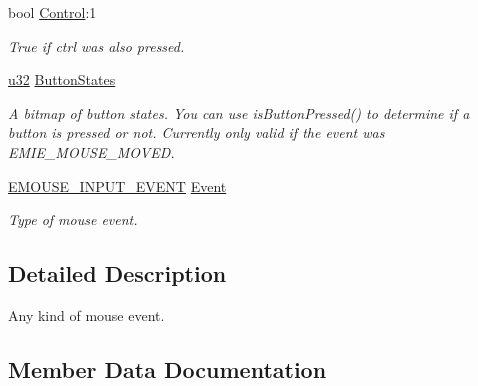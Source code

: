 \begin{DoxyCompactItemize}
bool \hyperlink{structirr_1_1SEvent_1_1SMouseInput_a2b0cf7a5d52c4489dbfc739fe62aa354}{Control}\+:1
\begin{DoxyCompactList}\small\item\em True if ctrl was also pressed. \end{DoxyCompactList}\item 
\mbox{\label{structirr_1_1SEvent_1_1SMouseInput_af2f4e21a673879db7f89335ccdc3efdd}} 
\hyperlink{namespaceirr_a0416a53257075833e7002efd0a18e804}{u32} \hyperlink{structirr_1_1SEvent_1_1SMouseInput_af2f4e21a673879db7f89335ccdc3efdd}{Button\+States}
\begin{DoxyCompactList}\small\item\em A bitmap of button states. You can use is\+Button\+Pressed() to determine if a button is pressed or not. Currently only valid if the event was E\+M\+I\+E\+\_\+\+M\+O\+U\+S\+E\+\_\+\+M\+O\+V\+ED. \end{DoxyCompactList}\item 
\mbox{\label{structirr_1_1SEvent_1_1SMouseInput_adc389bcfee10b86dc5c6d2f39c4f5acd}} 
\hyperlink{namespaceirr_a2dbf2a247aa17a9eeefbbf36ebd5739f}{E\+M\+O\+U\+S\+E\+\_\+\+I\+N\+P\+U\+T\+\_\+\+E\+V\+E\+NT} \hyperlink{structirr_1_1SEvent_1_1SMouseInput_adc389bcfee10b86dc5c6d2f39c4f5acd}{Event}
\begin{DoxyCompactList}\small\item\em Type of mouse event. \end{DoxyCompactList}\end{DoxyCompactItemize}


\subsection{Detailed Description}
Any kind of mouse event. 

\subsection{Member Data Documentation}
\mbox{\label{structirr_1_1SEvent_1_1SMouseInput_a0821c616196a7ffcc574e68c060b6d18}} 
